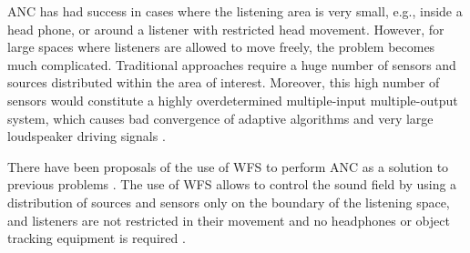 ANC has had success in cases where the listening area is very small, e.g., inside a head phone, or around a listener with restricted head movement. However, for large spaces where listeners are allowed to move freely, the problem becomes much complicated. Traditional approaches require a huge number of sensors and sources distributed within the area of interest. Moreover, this high number of sensors would constitute a highly overdetermined multiple-input multiple-output system, which causes bad convergence of adaptive algorithms and very large loudspeaker driving signals \cite{Kuntz2004}.

There have been proposals of the use of WFS to perform ANC as a solution to previous problems \cite{Zanolin1999} \cite{Kuntz2004} \cite{Lapini2016} \cite{Morcillo2015}. The use of WFS allows to control the sound field by using a distribution of sources and sensors only on the boundary of the listening space, and listeners are not restricted in their movement and no headphones or object tracking equipment is required \cite{Kuntz2004}.

